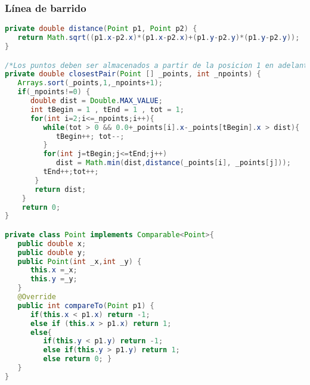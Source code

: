 \subsubsection{Línea de barrido}
\begin{lstlisting}[language=Java]
private double distance(Point p1, Point p2) {           
   return Math.sqrt((p1.x-p2.x)*(p1.x-p2.x)+(p1.y-p2.y)*(p1.y-p2.y)); 
}

/*Los puntos deben ser almacenados a partir de la posicion 1 en adelante y no en la posicion 0 como de costumbre*/
private double closestPair(Point [] _points, int _npoints) {
   Arrays.sort(_points,1,_npoints+1);
   if(_npoints!=0) {
      double dist = Double.MAX_VALUE;
      int tBegin = 1 , tEnd = 1 , tot = 1;
      for(int i=2;i<=_npoints;i++){
         while(tot > 0 && 0.0+_points[i].x-_points[tBegin].x > dist){ 
            tBegin++; tot--;
         }
         for(int j=tBegin;j<=tEnd;j++) 
            dist = Math.min(dist,distance(_points[i], _points[j])); 
         tEnd++;tot++;
       }
       return dist;
    }
    return 0;
}

private class Point implements Comparable<Point>{
   public double x;
   public double y;
   public Point(int _x,int _y) {
      this.x =_x;
      this.y =_y;
   }
   @Override
   public int compareTo(Point p1) {
      if(this.x < p1.x) return -1;
      else if (this.x > p1.x) return 1;
      else{ 
         if(this.y < p1.y) return -1;
         else if(this.y > p1.y) return 1;
         else return 0; }
   }
}	
\end{lstlisting}